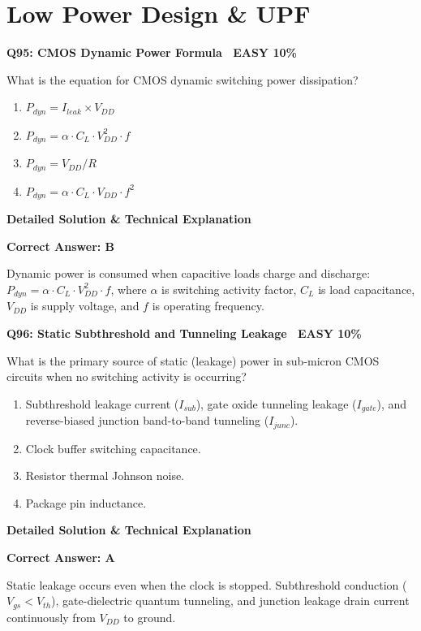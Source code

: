 \documentclass[11pt,a4paper]{article}
\newcommand{\badgeeasy}{{\color{white}\colorbox{easygreen}{\bfseries\sffamily\tiny\ EASY 10\%\ }}}
\newenvironment{qbox}[2]{%
  \begin{mdframed}[style=qstyle]%
  {\bfseries\sffamily\color{primaryblue}#1 \hfill #2}\par\vspace{2pt}%
}{%
  \end{mdframed}%
}
\newenvironment{ansbox}{%
  \begin{mdframed}[style=ansstyle]%
  {\bfseries\sffamily\color{ansgreen}\small Detailed Solution \& Technical Explanation}\par\vspace{2pt}\small%
}{%
  \end{mdframed}%
}
\begin{document}
\section{Low Power Design \& UPF}

\begin{qbox}{Q95: CMOS Dynamic Power Formula}{\badgeeasy}
What is the equation for CMOS dynamic switching power dissipation?
\begin{enumerate}[label=\textbf{\Alph*.}]
  \item $P_{dyn} = I_{leak} \times V_{DD}$
  \item $P_{dyn} = \alpha \cdot C_L \cdot V_{DD}^2 \cdot f$
  \item $P_{dyn} = V_{DD} / R$
  \item $P_{dyn} = \alpha \cdot C_L \cdot V_{DD} \cdot f^2$
\end{enumerate}
\end{qbox}
\begin{ansbox}
\textbf{Correct Answer: B}

Dynamic power is consumed when capacitive loads charge and discharge: $P_{dyn} = \alpha \cdot C_L \cdot V_{DD}^2 \cdot f$, where $\alpha$ is switching activity factor, $C_L$ is load capacitance, $V_{DD}$ is supply voltage, and $f$ is operating frequency.
\end{ansbox}

\begin{qbox}{Q96: Static Subthreshold and Tunneling Leakage}{\badgeeasy}
What is the primary source of static (leakage) power in sub-micron CMOS circuits when no switching activity is occurring?
\begin{enumerate}[label=\textbf{\Alph*.}]
  \item Subthreshold leakage current ($I_{sub}$), gate oxide tunneling leakage ($I_{gate}$), and reverse-biased junction band-to-band tunneling ($I_{junc}$).
  \item Clock buffer switching capacitance.
  \item Resistor thermal Johnson noise.
  \item Package pin inductance.
\end{enumerate}
\end{qbox}
\begin{ansbox}
\textbf{Correct Answer: A}

Static leakage occurs even when the clock is stopped. Subthreshold conduction ($V_{gs} < V_{th}$), gate-dielectric quantum tunneling, and junction leakage drain current continuously from $V_{DD}$ to ground.
\end{ansbox}
\end{document}
